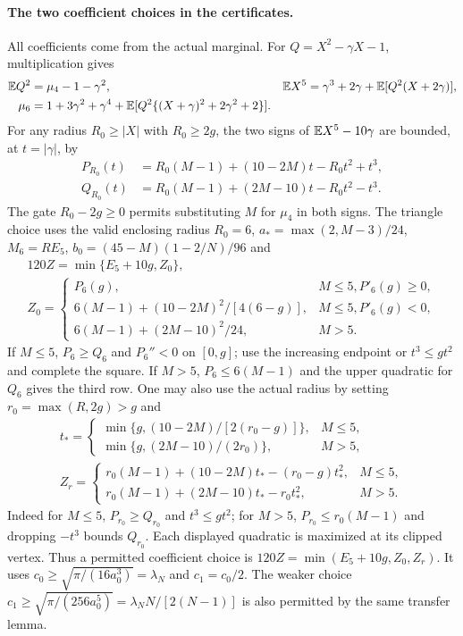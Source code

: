 \paragraph{The two coefficient choices in the certificates.}
All coefficients come from the actual marginal. For $Q=X^2-\gamma X-1$,
multiplication gives
\begin{align}\label{ms:fourier:rescore:fourier-pearson}
 \mathbb E Q^2&=\mu_4-1-\gamma^2,&
 \mathbb E X^5&=\gamma^3+2\gamma+\mathbb E[Q^2(X+2\gamma)],\notag\\
 \mu_6&=1+3\gamma^2+\gamma^4+
       \mathbb E[Q^2\{(X+\gamma)^2+2\gamma^2+2\}].
\end{align}
For any radius $R_0\ge|X|$ with $R_0\ge2g$, the two signs of
$\mathbb E X^5-10\gamma$ are bounded, at $t=|\gamma|$, by
\begin{align*}
 P_{R_0}(t)&=R_0(M-1)+(10-2M)t-R_0t^2+t^3,\\
 Q_{R_0}(t)&=R_0(M-1)+(2M-10)t-R_0t^2-t^3.
\end{align*}
The gate $R_0-2g\ge0$ permits substituting $M$ for $\mu_4$ in both
signs. The triangle choice uses the valid enclosing radius $R_0=6$, $a_* =\max(2,M-3)/24$,
$M_6=RE_5$, $b_0=(45-M)(1-2/N)/96$ and
\begin{equation}\label{ms:fourier:rescore:fourier-z0}
\begin{gathered}
 120Z=\min\{E_5+10g,Z_0\},\\
 Z_0=\begin{cases}
 P_6(g),&M\le5, P'_6(g)\ge0,\\
 6(M-1)+(10-2M)^2/[4(6-g)],&M\le5, P'_6(g)<0,\\
 6(M-1)+(2M-10)^2/24,&M>5.
 \end{cases}
\end{gathered}
\end{equation}
If $M\le5$, $P_6\ge Q_6$ and $P_6''<0$ on $[0,g]$; use the
increasing endpoint or $t^3\le gt^2$ and complete the square.
If $M>5$, $P_6\le6(M-1)$ and the upper quadratic for $Q_6$ gives
the third row. One may also use the actual radius by setting
$r_0=\max(R,2g)>g$ and
\[
\begin{gathered}
 t_*=\begin{cases}
 \min\{g,(10-2M)/[2(r_0-g)]\},&M\le5,\\
 \min\{g,(2M-10)/(2r_0)\},&M>5,
 \end{cases}\\
 Z_r=\begin{cases}
 r_0(M-1)+(10-2M)t_*-(r_0-g)t_*^2,&M\le5,\\
 r_0(M-1)+(2M-10)t_*-r_0t_*^2,&M>5.
 \end{cases}
\end{gathered}
\]
Indeed for $M\le5$, $P_{r_0}\ge Q_{r_0}$ and $t^3\le gt^2$;
for $M>5$, $P_{r_0}\le r_0(M-1)$ and dropping $-t^3$ bounds
$Q_{r_0}$. Each displayed quadratic is maximized at its clipped vertex.
Thus a permitted coefficient choice is
$120Z=\min(E_5+10g,Z_0,Z_r)$.
It uses $c_0\ge\sqrt{\pi/(16a_0^3)}=\lambda_N$ and $c_1=c_0/2$.
The weaker choice $c_1\ge\sqrt{\pi/(256a_0^5)}
=\lambda_N N/[2(N-1)]$ is also permitted by the same transfer lemma.


